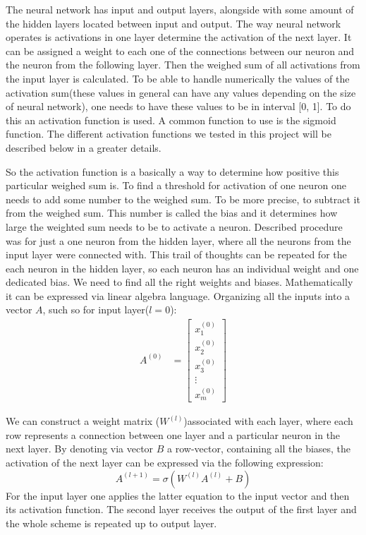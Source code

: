 \documentclass[10pt]{article}
\begin{document}
The neural network has input and output layers, alongside with some amount of the hidden layers located between input and output. The way neural network operates is activations in one layer determine the activation of the next layer.
It can be assigned a weight to each one of the connections between our neuron and the neuron from the following layer. Then the weighed sum of all activations from the input layer is calculated. To be able to handle numerically the values of the activation sum(these values in general can have any values depending on the size of neural network), one needs to have these values to be in interval [0, 1]. To do this an activation function is used. A common function to use is the sigmoid function. The different activation functions we tested in this project will be described below in a greater details.

So the activation function is a basically a way to determine how positive this particular weighed sum is. To find a threshold for activation of one neuron one needs to add some number to the weighed sum. To be more precise, to subtract it from the weighed sum. This number is called the bias and it determines how large the weighted sum needs to be to activate a neuron.
Described procedure was for just a one neuron from the hidden layer, where all the neurons from the input layer were connected with. This trail of thoughts can be repeated for the each neuron in the hidden layer, so each neuron has an individual weight and one dedicated bias. We need to find all the right weights and biases.
Mathematically it can be expressed via linear algebra language. Organizing all the inputs into a vector $A$, such so for input layer($l=0$):
\begin{align}
A^{(0)} &= \begin{bmatrix}
x_{1}^{(0)} \\
x_{2}^{(0)} \\
x_{3}^{(0)} \\
\vdots \\
x_{m}^{(0)}
\end{bmatrix}
\end{align}

We can construct a weight matrix ($W^{(l)}$)associated with each layer, where each row represents a connection between one layer and a particular neuron in the next layer. By denoting via vector $B$ a row-vector, containing all the biases, the activation of the next layer can be expressed via the following expression:
\begin{equation}
A^{(l+1)}    = \sigma (W^{(l)} A^{(l)} + B)
\end{equation}
For the input layer one applies the latter equation to the input vector and then its activation function. The second layer receives the output of the first layer and the whole scheme is repeated up to output layer.
\end{document}
